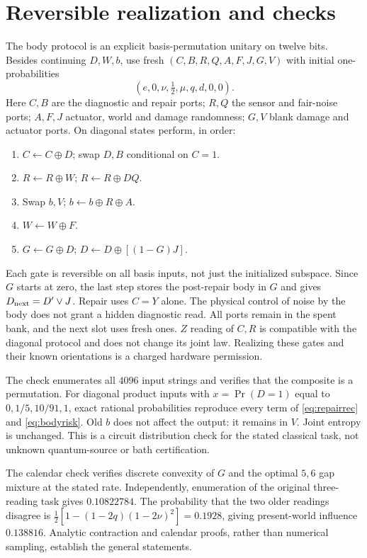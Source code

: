 \documentclass[11pt,a4paper]{article}
\begin{document}
\appendix
\section{Reversible realization and checks}\label{app:circuit}

The body protocol is an explicit basis-permutation unitary on twelve
bits. Besides continuing \(D,W,b\), use fresh
\((C,B,R,Q,A,F,J,G,V)\) with initial one-probabilities
\[
(e,0,\nu,\tfrac12,\mu,q,d,0,0).
\]
Here \(C,B\) are the diagnostic and repair ports; \(R,Q\) the
sensor and fair-noise ports; \(A,F,J\) actuator, world and damage
randomness; \(G,V\) blank damage and actuator ports.
On diagonal states perform, in order:
\begin{enumerate}
\item \(C\leftarrow C\oplus D\); swap \(D,B\) conditional on \(C=1\).
\item \(R\leftarrow R\oplus W\); \(R\leftarrow R\oplus DQ\).
\item Swap \(b,V\); \(b\leftarrow b\oplus R\oplus A\).
\item \(W\leftarrow W\oplus F\).
\item \(G\leftarrow G\oplus D\);
 \(D\leftarrow D\oplus[(1-G)J]\).
\end{enumerate}
Each gate is reversible on all basis inputs, not just the initialized
subspace. Since \(G\) starts at zero, the last step stores the
post-repair body in \(G\) and gives \(D_{\rm next}=D'\lor J\).
Repair uses \(C=Y\) alone. The physical control of noise by the body
does not grant a hidden diagnostic read. All ports remain in the
spent bank, and the next slot uses fresh ones. \(Z\) reading of \(C,R\)
is compatible with the diagonal protocol and does not change its
joint law. Realizing these gates and their known orientations is
a charged hardware permission.

The check enumerates all \(4096\) input strings and verifies that
the composite is a permutation. For diagonal product inputs with
\(x=\Pr(D=1)\) equal to \(0,1/5,10/91,1\), exact rational probabilities
reproduce every term of \eqref{eq:repairrec} and \eqref{eq:bodyrisk}.
Old \(b\) does not affect the output: it remains in \(V\).
Joint entropy is unchanged. This is a circuit distribution check
for the stated classical task, not unknown quantum-source or bath
certification.

The calendar check verifies discrete convexity of \(G\) and the
optimal \(5,6\) gap mixture at the stated rate. Independently,
enumeration of the original three-reading task gives \(0.10822784\).
The probability that the two older readings disagree is
\(\frac12[1-(1-2q)(1-2\nu)^2]=0.1928\), giving present-world
influence \(0.138816\). Analytic contraction and calendar proofs,
rather than numerical sampling, establish the general statements.
\end{document}
